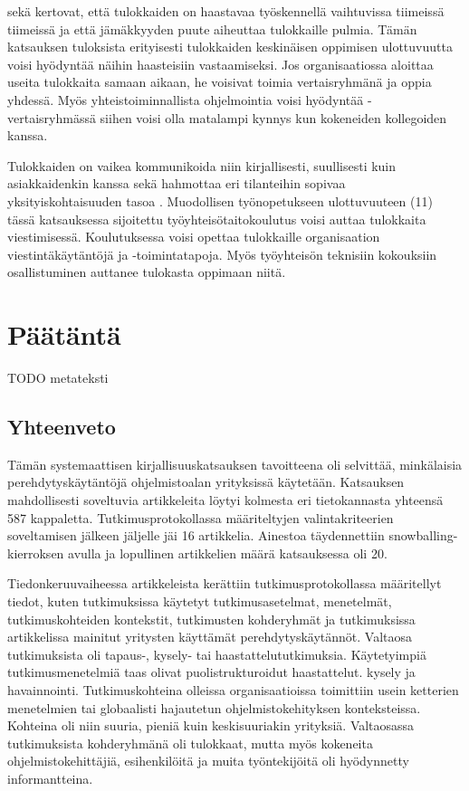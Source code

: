 \documentclass[utf8]{gradu3}
\begin{document}
\textcite{britto-ym-2019} sekä \textcite{begel-simon-2008} kertovat, että tulokkaiden on haastavaa työskennellä vaihtuvissa tiimeissä tiimeissä ja että jämäkkyyden puute aiheuttaa tulokkaille pulmia. Tämän katsauksen tuloksista erityisesti tulokkaiden keskinäisen oppimisen ulottuvuutta voisi hyödyntää näihin haasteisiin vastaamiseksi. Jos organisaatiossa aloittaa useita tulokkaita samaan aikaan, he voisivat toimia vertaisryhmänä ja oppia yhdessä. Myös yhteistoiminnallista ohjelmointia voisi hyödyntää - vertaisryhmässä siihen voisi olla matalampi kynnys kun kokeneiden kollegoiden kanssa. 

Tulokkaiden on vaikea kommunikoida niin kirjallisesti, suullisesti kuin asiakkaidenkin kanssa sekä hahmottaa eri tilanteihin sopivaa yksityiskohtaisuuden tasoa %
\parencites%
    {radermacher-ym-2015}%
    {begel-simon-2008}%
\relax.
%
Muodollisen työnopetukseen ulottuvuuteen (11) tässä katsauksessa sijoitettu työyhteisötaitokoulutus voisi auttaa tulokkaita viestimisessä. Koulutuksessa voisi opettaa tulokkaille organisaation viestintäkäytäntöjä ja -toimintatapoja. Myös työyhteisön teknisiin kokouksiin osallistuminen auttanee tulokasta oppimaan niitä.

\chapter{Päätäntä}
\label{paaluku-paatanta}

TODO metateksti

\section{Yhteenveto}

Tämän systemaattisen kirjallisuuskatsauksen tavoitteena oli selvittää, minkälaisia perehdytyskäytäntöjä ohjelmistoalan yrityksissä käytetään. Katsauksen mahdollisesti soveltuvia artikkeleita löytyi kolmesta eri tietokannasta yhteensä 587 kappaletta. Tutkimusprotokollassa määriteltyjen valintakriteerien soveltamisen jälkeen jäljelle jäi 16 artikkelia. Ainestoa täydennettiin snowballing-kierroksen avulla ja lopullinen artikkelien määrä katsauksessa oli 20.

Tiedonkeruuvaiheessa artikkeleista kerättiin tutkimusprotokollassa määritellyt tiedot, kuten tutkimuksissa käytetyt tutkimusasetelmat, menetelmät, tutkimuskohteiden kontekstit, tutkimusten kohderyhmät ja tutkimuksissa artikkelissa mainitut yritysten käyttämät perehdytyskäytännöt. Valtaosa tutkimuksista oli tapaus-, kysely- tai haastattelututkimuksia. Käytetyimpiä tutkimusmenetelmiä taas olivat puolistrukturoidut haastattelut. kysely ja havainnointi. Tutkimuskohteina olleissa organisaatioissa toimittiin usein ketterien menetelmien tai globaalisti hajautetun ohjelmistokehityksen  konteksteissa. Kohteina oli niin suuria, pieniä kuin keskisuuriakin yrityksiä. Valtaosassa tutkimuksista kohderyhmänä oli tulokkaat, mutta myös kokeneita ohjelmistokehittäjiä, esihenkilöitä ja muita työntekijöitä oli hyödynnetty informantteina. 
\end{document}
